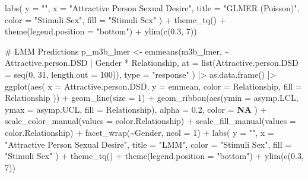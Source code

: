 \documentclass[
  bookmarksnumbered]{article}
\newenvironment{Shaded}{\begin{snugshade}}{\end{snugshade}}
\newcommand{\AttributeTok}[1]{\textcolor[rgb]{0.80,0.80,0.80}{#1}}
\newcommand{\CommentTok}[1]{\textcolor[rgb]{0.50,0.62,0.50}{#1}}
\newcommand{\ConstantTok}[1]{\textcolor[rgb]{0.86,0.64,0.64}{\textbf{#1}}}
\newcommand{\DecValTok}[1]{\textcolor[rgb]{0.86,0.86,0.80}{#1}}
\newcommand{\FloatTok}[1]{\textcolor[rgb]{0.75,0.75,0.82}{#1}}
\newcommand{\FunctionTok}[1]{\textcolor[rgb]{0.94,0.94,0.56}{#1}}
\newcommand{\NormalTok}[1]{\textcolor[rgb]{0.80,0.80,0.80}{#1}}
\newcommand{\OtherTok}[1]{\textcolor[rgb]{0.94,0.94,0.56}{#1}}
\newcommand{\SpecialCharTok}[1]{\textcolor[rgb]{0.86,0.64,0.64}{#1}}
\newcommand{\StringTok}[1]{\textcolor[rgb]{0.80,0.58,0.58}{#1}}
\begin{document}
\begin{Shaded}
\begin{Highlighting}[]
  \FunctionTok{labs}\NormalTok{(}
    \AttributeTok{y =} \StringTok{""}\NormalTok{, }\AttributeTok{x =} \StringTok{"Attractive Person Sexual Desire"}\NormalTok{,}
    \AttributeTok{title =} \StringTok{"GLMER (Poisson)"}\NormalTok{,}
    \AttributeTok{color =} \StringTok{"Stimuli Sex"}\NormalTok{, }\AttributeTok{fill =} \StringTok{"Stimuli Sex"}
\NormalTok{  ) }\SpecialCharTok{+}
  \FunctionTok{theme\_tq}\NormalTok{() }\SpecialCharTok{+}
  \FunctionTok{theme}\NormalTok{(}\AttributeTok{legend.position =} \StringTok{"bottom"}\NormalTok{) }\SpecialCharTok{+}
  \FunctionTok{ylim}\NormalTok{(}\FunctionTok{c}\NormalTok{(}\FloatTok{0.3}\NormalTok{, }\DecValTok{7}\NormalTok{))}

\CommentTok{\# LMM Predictions}
\NormalTok{p\_m3b\_lmer }\OtherTok{\textless{}{-}} \FunctionTok{emmeans}\NormalTok{(m3b\_lmer, }\SpecialCharTok{\textasciitilde{}}\NormalTok{ Attractive.person.DSD }\SpecialCharTok{|}\NormalTok{ Gender }\SpecialCharTok{*}\NormalTok{ Relationship,}
  \AttributeTok{at =} \FunctionTok{list}\NormalTok{(}\AttributeTok{Attractive.person.DSD =} \FunctionTok{seq}\NormalTok{(}\DecValTok{0}\NormalTok{, }\DecValTok{31}\NormalTok{, }\AttributeTok{length.out =} \DecValTok{100}\NormalTok{)),}
  \AttributeTok{type =} \StringTok{"response"}
\NormalTok{) }\SpecialCharTok{|\textgreater{}}
  \FunctionTok{as.data.frame}\NormalTok{() }\SpecialCharTok{|\textgreater{}}
  \FunctionTok{ggplot}\NormalTok{(}\FunctionTok{aes}\NormalTok{(}
    \AttributeTok{x =}\NormalTok{ Attractive.person.DSD, }\AttributeTok{y =}\NormalTok{ emmean,}
    \AttributeTok{color =}\NormalTok{ Relationship, }\AttributeTok{fill =}\NormalTok{ Relationship}
\NormalTok{  )) }\SpecialCharTok{+}
  \FunctionTok{geom\_line}\NormalTok{(}\AttributeTok{size =} \DecValTok{1}\NormalTok{) }\SpecialCharTok{+}
  \FunctionTok{geom\_ribbon}\NormalTok{(}\FunctionTok{aes}\NormalTok{(}\AttributeTok{ymin =}\NormalTok{ asymp.LCL, }\AttributeTok{ymax =}\NormalTok{ asymp.UCL, }\AttributeTok{fill =}\NormalTok{ Relationship),}
    \AttributeTok{alpha =} \FloatTok{0.2}\NormalTok{, }\AttributeTok{color =} \ConstantTok{NA}
\NormalTok{  ) }\SpecialCharTok{+}
  \FunctionTok{scale\_color\_manual}\NormalTok{(}\AttributeTok{values =}\NormalTok{ color.Relationship) }\SpecialCharTok{+}
  \FunctionTok{scale\_fill\_manual}\NormalTok{(}\AttributeTok{values =}\NormalTok{ color.Relationship) }\SpecialCharTok{+}
  \FunctionTok{facet\_wrap}\NormalTok{(}\SpecialCharTok{\textasciitilde{}}\NormalTok{Gender, }\AttributeTok{ncol =} \DecValTok{1}\NormalTok{) }\SpecialCharTok{+}
  \FunctionTok{labs}\NormalTok{(}
    \AttributeTok{y =} \StringTok{""}\NormalTok{, }\AttributeTok{x =} \StringTok{"Attractive Person Sexual Desire"}\NormalTok{,}
    \AttributeTok{title =} \StringTok{"LMM"}\NormalTok{,}
    \AttributeTok{color =} \StringTok{"Stimuli Sex"}\NormalTok{, }\AttributeTok{fill =} \StringTok{"Stimuli Sex"}
\NormalTok{  ) }\SpecialCharTok{+}
  \FunctionTok{theme\_tq}\NormalTok{() }\SpecialCharTok{+}
  \FunctionTok{theme}\NormalTok{(}\AttributeTok{legend.position =} \StringTok{"bottom"}\NormalTok{) }\SpecialCharTok{+}
  \FunctionTok{ylim}\NormalTok{(}\FunctionTok{c}\NormalTok{(}\FloatTok{0.3}\NormalTok{, }\DecValTok{7}\NormalTok{))}


\end{Highlighting}
\end{Shaded}
\end{document}
